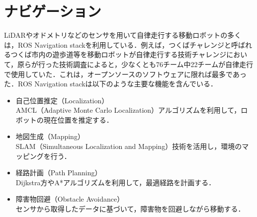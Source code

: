 
\section{ナビゲーション}
LiDARやオドメトリなどのセンサを用いて自律走行する移動ロボットの多くは，ROS Navigation stackを利用している．例えば，つくばチャレンジと呼ばれるつくば市内の遊歩道等を移動ロボットが自律走行する技術チャレンジにおいて，原らが行った技術調査によると，少なくとも76チーム中22チームが自律走行で使用していた．これは，オープンソースのソフトウェアに限れば最多であった．ROS Navigation stackは以下のような主要な機能を含んでいる．

\begin{itemize}
     \item 自己位置推定（Localization）\\
     AMCL（Adaptive Monte Carlo Localization）アルゴリズムを利用して，ロボットの現在位置を推定する．
     \item 地図生成（Mapping）\\
     SLAM（Simultaneous Localization and Mapping）技術を活用し，環境のマッピングを行う．
     \item 経路計画（Path Planning）\\
     Dijkstra方やA*アルゴリズムを利用して，最適経路を計画する．
     \item 障害物回避（Obstacle Avoidance）\\
     センサから取得したデータに基づいて，障害物を回避しながら移動する．
\end{itemize}

\newpage
